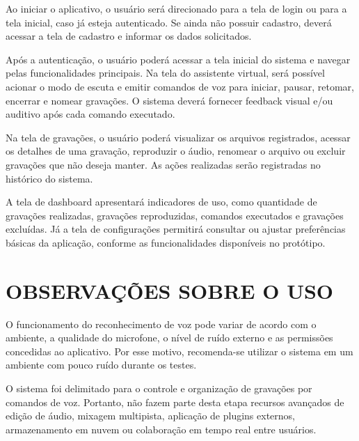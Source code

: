 \documentclass[12pt,oneside,a4paper,brazil,final]{abntex2}
\begin{document}
\begin{apendicesenv}
Ao iniciar o aplicativo, o usuário será direcionado para a tela de login ou para a tela inicial, caso já esteja autenticado. Se ainda não possuir cadastro, deverá acessar a tela de cadastro e informar os dados solicitados.



Após a autenticação, o usuário poderá acessar a tela inicial do sistema e navegar pelas funcionalidades principais. Na tela do assistente virtual, será possível acionar o modo de escuta e emitir comandos de voz para iniciar, pausar, retomar, encerrar e nomear gravações. O sistema deverá fornecer feedback visual e/ou auditivo após cada comando executado.



Na tela de gravações, o usuário poderá visualizar os arquivos registrados, acessar os detalhes de uma gravação, reproduzir o áudio, renomear o arquivo ou excluir gravações que não deseja manter. As ações realizadas serão registradas no histórico do sistema.



A tela de dashboard apresentará indicadores de uso, como quantidade de gravações realizadas, gravações reproduzidas, comandos executados e gravações excluídas. Já a tela de configurações permitirá consultar ou ajustar preferências básicas da aplicação, conforme as funcionalidades disponíveis no protótipo.



\section{OBSERVAÇÕES SOBRE O USO}



O funcionamento do reconhecimento de voz pode variar de acordo com o ambiente, a qualidade do microfone, o nível de ruído externo e as permissões concedidas ao aplicativo. Por esse motivo, recomenda-se utilizar o sistema em um ambiente com pouco ruído durante os testes.



O sistema foi delimitado para o controle e organização de gravações por comandos de voz. Portanto, não fazem parte desta etapa recursos avançados de edição de áudio, mixagem multipista, aplicação de plugins externos, armazenamento em nuvem ou colaboração em tempo real entre usuários.





\end{apendicesenv}
\end{document}
